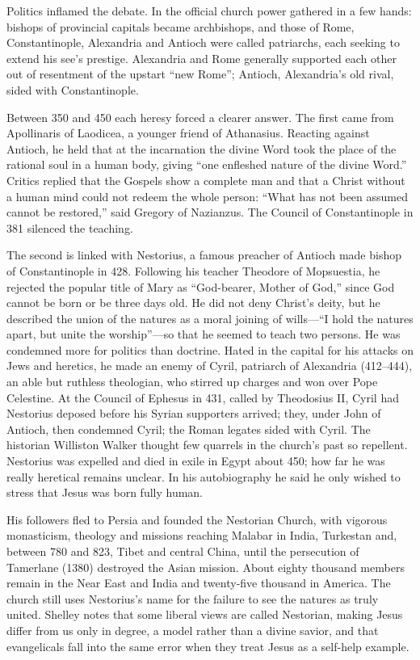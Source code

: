 Politics inflamed the debate. In the official church power gathered in a few hands: bishops of
provincial capitals became archbishops, and those of Rome, Constantinople, Alexandria and Antioch
were called patriarchs, each seeking to extend his see's prestige. Alexandria and Rome generally
supported each other out of resentment of the upstart ``new Rome''; Antioch, Alexandria's old rival,
sided with Constantinople.

Between 350 and 450 each heresy forced a clearer answer. The first came from Apollinaris of Laodicea,
a younger friend of Athanasius. Reacting against Antioch, he held that at the incarnation the divine
Word took the place of the rational soul in a human body, giving ``one enfleshed nature of the divine
Word.'' Critics replied that the Gospels show a complete man and that a Christ without a human mind
could not redeem the whole person: ``What has not been assumed cannot be restored,'' said Gregory of
Nazianzus. The Council of Constantinople in 381 silenced the teaching.

The second is linked with Nestorius, a famous preacher of Antioch made bishop of Constantinople in
428. Following his teacher Theodore of Mopsuestia, he rejected the popular title of Mary as
``God-bearer, Mother of God,'' since God cannot be born or be three days old. He did not deny Christ's
deity, but he described the union of the natures as a moral joining of wills---``I hold the natures
apart, but unite the worship''---so that he seemed to teach two persons. He was condemned more for
politics than doctrine. Hated in the capital for his attacks on Jews and heretics, he made an enemy of
Cyril, patriarch of Alexandria (412--444), an able but ruthless theologian, who stirred up charges and
won over Pope Celestine. At the Council of Ephesus in 431, called by Theodosius II, Cyril had
Nestorius deposed before his Syrian supporters arrived; they, under John of Antioch, then condemned
Cyril; the Roman legates sided with Cyril. The historian Williston Walker thought few quarrels in the church's past so repellent. Nestorius was expelled and died in exile in Egypt about 450; how far he
was really heretical remains unclear. In his autobiography he said he only wished to stress that
Jesus was born fully human.

His followers fled to Persia and founded the Nestorian Church, with vigorous monasticism, theology
and missions reaching Malabar in India, Turkestan and, between 780 and 823, Tibet and central China,
until the persecution of Tamerlane (1380) destroyed the Asian mission. About eighty thousand members
remain in the Near East and India and twenty-five thousand in America. The church still uses
Nestorius's name for the failure to see the natures as truly united. Shelley notes that some liberal
views are called Nestorian, making Jesus differ from us only in degree, a model rather than a divine
savior, and that evangelicals fall into the same error when they treat Jesus as a self-help example.

